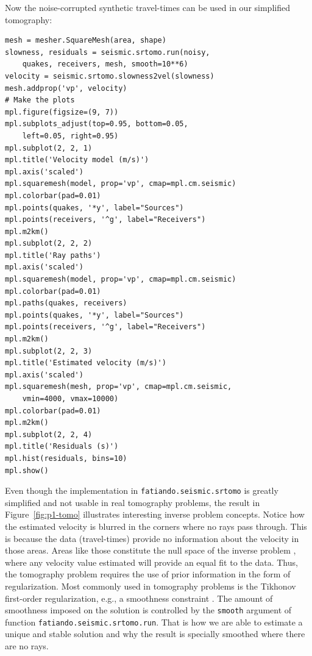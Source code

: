 Now the noise-corrupted synthetic travel-times can be used in our
simplified tomography:

\begin{verbatim}
mesh = mesher.SquareMesh(area, shape)
slowness, residuals = seismic.srtomo.run(noisy,
    quakes, receivers, mesh, smooth=10**6)
velocity = seismic.srtomo.slowness2vel(slowness)
mesh.addprop('vp', velocity)
# Make the plots
mpl.figure(figsize=(9, 7))
mpl.subplots_adjust(top=0.95, bottom=0.05,
    left=0.05, right=0.95)
mpl.subplot(2, 2, 1)
mpl.title('Velocity model (m/s)')
mpl.axis('scaled')
mpl.squaremesh(model, prop='vp', cmap=mpl.cm.seismic)
mpl.colorbar(pad=0.01)
mpl.points(quakes, '*y', label="Sources")
mpl.points(receivers, '^g', label="Receivers")
mpl.m2km()
mpl.subplot(2, 2, 2)
mpl.title('Ray paths')
mpl.axis('scaled')
mpl.squaremesh(model, prop='vp', cmap=mpl.cm.seismic)
mpl.colorbar(pad=0.01)
mpl.paths(quakes, receivers)
mpl.points(quakes, '*y', label="Sources")
mpl.points(receivers, '^g', label="Receivers")
mpl.m2km()
mpl.subplot(2, 2, 3)
mpl.title('Estimated velocity (m/s)')
mpl.axis('scaled')
mpl.squaremesh(mesh, prop='vp', cmap=mpl.cm.seismic,
    vmin=4000, vmax=10000)
mpl.colorbar(pad=0.01)
mpl.m2km()
mpl.subplot(2, 2, 4)
mpl.title('Residuals (s)')
mpl.hist(residuals, bins=10)
mpl.show()
\end{verbatim}

Even though the implementation in \texttt{fatiando.seismic.srtomo} is greatly
simplified and not usable in real tomography problems, the result in
Figure~\ref{fig:p1-tomo} illustrates interesting inverse problem concepts.  Notice
how the estimated velocity is blurred in the corners where no rays pass
through. This is because the data (travel-times) provide no information about
the velocity in those areas. Areas like those constitute the null space of the
inverse problem \citep{menke1984}, where any velocity value estimated will
provide an equal fit to the data.  Thus, the tomography problem requires the
use of prior information in the form of regularization. Most commonly used in
tomography problems is the Tikhonov first-order regularization, e.g., a
smoothness constraint \citep{menke1984}. The amount of smoothness imposed on
the solution is controlled by the \texttt{smooth} argument of function
\texttt{fatiando.seismic.srtomo.run}. That is how we are able to estimate a
unique and stable solution and why the result is specially smoothed where there
are no rays.



